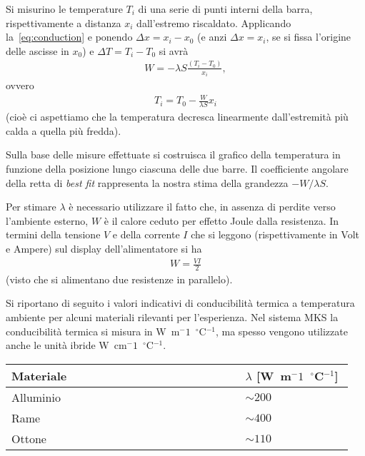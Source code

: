 \documentclass{lab1-article}
\begin{document}
\begin{article}
Si misurino le temperature $T_i$ di una serie di punti interni della barra,
rispettivamente a distanza $x_i$ dall'estremo riscaldato. Applicando
la~\eqref{eq:conduction} e ponendo $\Delta x = x_i - x_0$ (e anzi
$\Delta x = x_i$, se si fissa l’origine delle ascisse in $x_0$) e
$\Delta T = T_i - T_0$ si avr\`a
\begin{align}
  W = -\lambda S \frac{(T_i - T_0)}{x_i},
\end{align}
ovvero
\begin{align}
  T_i = T_0 - \frac{W}{\lambda S} x_i
\end{align}
(cio\`e ci aspettiamo che la temperatura decresca linearmente dall'estremit\`a
pi\`u calda a quella pi\`u fredda).



Sulla base delle misure effettuate si costruisca il grafico della temperatura
in funzione della posizione lungo ciascuna delle due barre.
Il coefficiente angolare della retta di \emph{best fit} rappresenta la nostra
stima della grandezza $-W/\lambda S$.

Per stimare $\lambda$ \`e necessario utilizzare il fatto che, in assenza di
perdite verso l'ambiente esterno, $W$ \`e il calore ceduto per effetto Joule
dalla resistenza. In termini della tensione $V$ e della corrente $I$ che si
leggono (rispettivamente in Volt e Ampere) sul display dell'alimentatore si ha
\begin{align}
  W = \frac{V I}{2}
\end{align}
(visto che si alimentano due resistenze in parallelo).



\plasduinosave



Si riportano di seguito i valori indicativi di conducibilit\`a termica a
temperatura ambiente per alcuni materiali rilevanti per l'esperienza.
Nel sistema MKS la conducibilit\`a termica si misura in
W~m$^-1$~$^\circ$C$^{-1}$, ma spesso vengono utilizzate anche le unit\`a
ibride W~cm$^-1$~$^\circ$C$^{-1}$.

\medskip

\begin{center}
\begin{tabular}{p{0.65\linewidth}@{}p{0.3\linewidth}}
\hline
Materiale & $\lambda$ [W~m$^-1$~$^\circ$C$^{-1}$]\\
\hline
\hline
Alluminio & $\sim 200$\\
Rame & $\sim 400$\\
Ottone & $\sim 110$\\
\hline
\end{tabular}
\end{center}

\onecolumn




\end{article}
\end{document}
